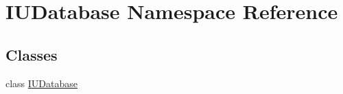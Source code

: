 \hypertarget{namespaceIUDatabase}{\section{I\-U\-Database Namespace Reference}
\label{namespaceIUDatabase}
}
\subsection*{Classes}
\begin{DoxyCompactItemize}
\item 
class \hyperlink{classIUDatabase_1_1IUDatabase}{I\-U\-Database}
\end{DoxyCompactItemize}
